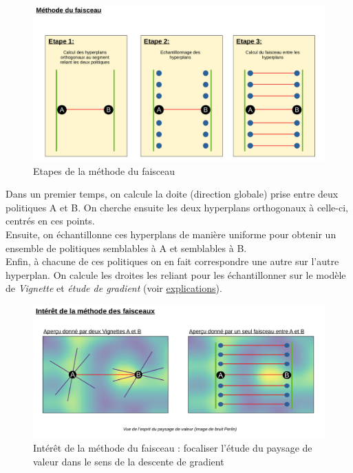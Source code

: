 \documentclass[12pt]{article}
\begin{document}
\begin{figure}[htp]
    \centering
    \includegraphics[width=18cm]{Images/faisceaux}
    \caption{Etapes de la méthode du faisceau}
    \label{fig:faisceaux}
\end{figure}

Dans un premier temps, on calcule la doite (direction globale) prise entre deux politiques A et B. On cherche ensuite les deux hyperplans orthogonaux à celle-ci, centrés en ces points. \\

Ensuite, on échantillonne ces hyperplans de manière uniforme pour obtenir un ensemble de politiques semblables à A et semblables à B. \\

Enfin, à chacune de ces politiques on en fait correspondre une autre sur l'autre hyperplan. On calcule les droites les reliant pour les échantillonner sur le modèle de \emph{Vignette} et \emph{étude de gradient} (voir \hyperref[fig:ligne1]{explications}). \\

\begin{figure}[htp]
    \centering
    \includegraphics[width=18cm]{Images/faisceaux_interet}
    \caption{Intérêt de la méthode du faisceau : focaliser l'étude du paysage de valeur dans le sens de la descente de gradient}
    \label{fig:faisceauxInteret}
\end{figure}
\end{document}
